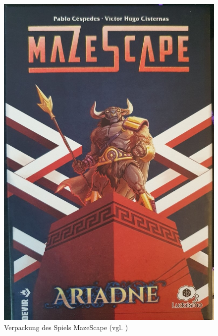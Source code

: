 \begin{figure}[ht]
\centering
\includegraphics[width=1\linewidth]{content/pictures/MazeScape.jpg}
\caption{Verpackung des Spiels MazeScape (vgl. \cite{noauthor_mazescape_nodate})}
\label{fig:mazescape}
\end{figure}

